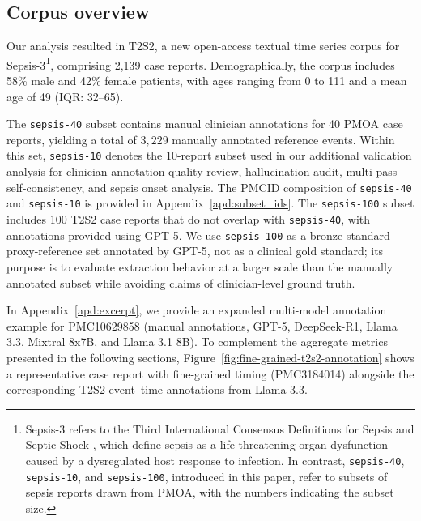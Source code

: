 \documentclass[pmlr,twocolumn,10pt]{jmlr} %
\begin{document}
\subsection{Corpus overview}
\vspace{-.5em}
Our analysis resulted in T2S2, a new open-access textual time series corpus for Sepsis-3\footnote{Sepsis-3 refers to the Third International Consensus Definitions for Sepsis and Septic Shock \citep{singer2016third}, which define sepsis as a life-threatening organ dysfunction caused by a dysregulated host response to infection.
In contrast, \texttt{sepsis-40}, \texttt{sepsis-10}, and \texttt{sepsis-100}, introduced in this paper, refer to subsets of sepsis reports drawn from PMOA, with the numbers indicating the subset size.}, 
comprising 2,139 case reports.  
Demographically, the corpus includes 58\% male and 42\% female patients, with ages ranging from 0 to 111 and a mean age of 49 (IQR: 32--65).

The \texttt{sepsis-40} subset contains manual clinician annotations for 40 PMOA case reports, yielding a total of $3,229$ manually annotated reference events.
Within this set, \texttt{sepsis-10} denotes the 10-report subset used in our additional validation analysis for clinician annotation quality review, hallucination audit, multi-pass self-consistency, and sepsis onset analysis.
The PMCID composition of \texttt{sepsis-40} and \texttt{sepsis-10} is provided in Appendix~\ref{apd:subset_ids}.
The \texttt{sepsis-100} subset includes 100 T2S2 case reports that do not overlap with \texttt{sepsis-40}, with annotations provided using GPT-5.
We use \texttt{sepsis-100} as a bronze-standard proxy-reference set annotated by GPT-5, not as a clinical gold standard; its purpose is to evaluate extraction behavior at a larger scale than the manually annotated subset while avoiding claims of clinician-level ground truth.

In Appendix~\ref{apd:excerpt}, we provide an expanded multi-model annotation example for PMC10629858 (manual annotations, GPT-5, DeepSeek-R1, Llama 3.3, Mixtral 8x7B, and Llama 3.1 8B).
To complement the aggregate metrics presented in the following sections, Figure~\ref{fig:fine-grained-t2s2-annotation} shows a representative case report with fine-grained timing (PMC3184014) alongside the corresponding T2S2 event--time annotations from Llama 3.3.

\end{document}
